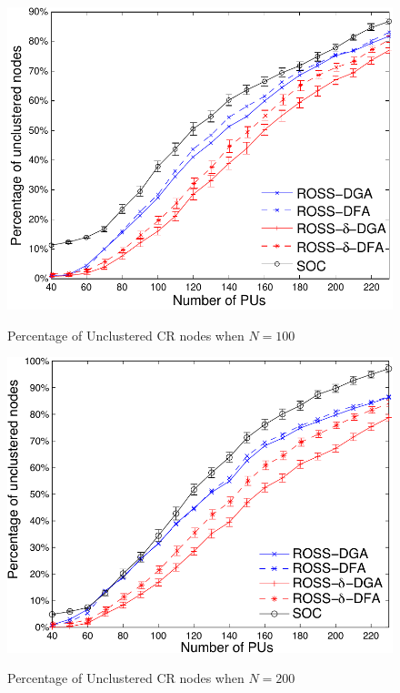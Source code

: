 \documentclass[times]{ettauth}
\theoremstyle{mytheoremstyle}
\theoremstyle{mytheoremstyle}
\theoremstyle{mytheoremstyle}
\begin{document}
\begin{figure}[t]
\begin{multicols}{3}
    \includegraphics[width=\linewidth]{survival_rate_100_edge50.pdf}\par\caption{Percentage of Unclustered CR nodes when $N=100$}\label{singleton_clusters_100}
    \includegraphics[width=\linewidth]{survival_rate_200_edge50.pdf}\par\caption{Percentage of Unclustered CR nodes when $N=200$}\label{singleton_clusters_200}

\end{multicols}
\end{figure}
\end{document}
